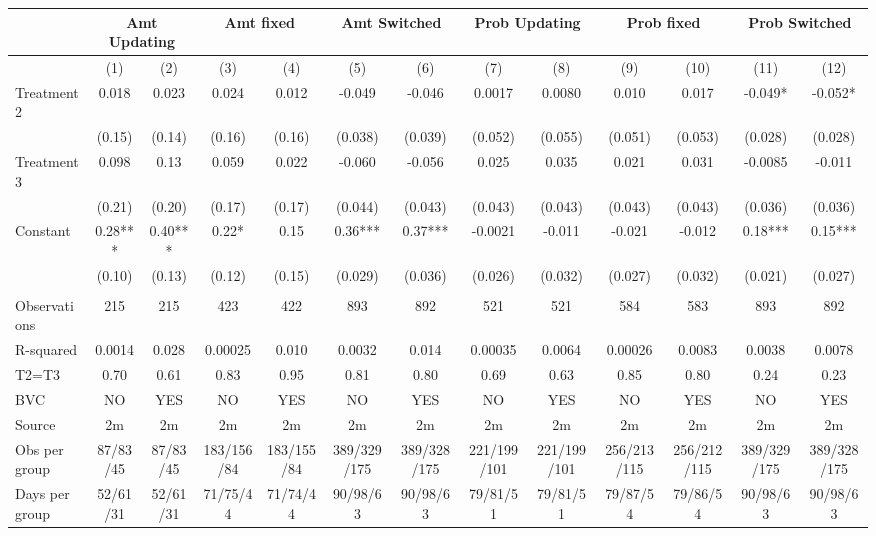 \begin{tabular}{lcccccccccccc}
\toprule
      & \multicolumn{2}{c}{Amt Updating } & \multicolumn{2}{c}{Amt fixed} & \multicolumn{2}{c}{Amt Switched } & \multicolumn{2}{c}{Prob Updating } & \multicolumn{2}{c}{Prob fixed} & \multicolumn{2}{c}{Prob Switched } \\
\midrule
\midrule
      & (1)   & (2)   & (3)   & (4)   & (5)   & (6)   & (7)   & (8)   & (9)   & (10)  & (11)  & (12) \\
\midrule
\midrule
Treatment 2 & 0.018 & 0.023 & 0.024 & 0.012 & -0.049 & -0.046 & 0.0017 & 0.0080 & 0.010 & 0.017 & -0.049* & -0.052* \\
      & (0.15) & (0.14) & (0.16) & (0.16) & (0.038) & (0.039) & (0.052) & (0.055) & (0.051) & (0.053) & (0.028) & (0.028) \\
Treatment 3 & 0.098 & 0.13  & 0.059 & 0.022 & -0.060 & -0.056 & 0.025 & 0.035 & 0.021 & 0.031 & -0.0085 & -0.011 \\
      & (0.21) & (0.20) & (0.17) & (0.17) & (0.044) & (0.043) & (0.043) & (0.043) & (0.043) & (0.043) & (0.036) & (0.036) \\
Constant & 0.28*** & 0.40*** & 0.22* & 0.15  & 0.36*** & 0.37*** & -0.0021 & -0.011 & -0.021 & -0.012 & 0.18*** & 0.15*** \\
      & (0.10) & (0.13) & (0.12) & (0.15) & (0.029) & (0.036) & (0.026) & (0.032) & (0.027) & (0.032) & (0.021) & (0.027) \\
      &       &       &       &       &       &       &       &       &       &       &       &  \\
\midrule
Observations & 215   & 215   & 423   & 422   & 893   & 892   & 521   & 521   & 584   & 583   & 893   & 892 \\
R-squared & 0.0014 & 0.028 & 0.00025 & 0.010 & 0.0032 & 0.014 & 0.00035 & 0.0064 & 0.00026 & 0.0083 & 0.0038 & 0.0078 \\
T2=T3 & 0.70  & 0.61  & 0.83  & 0.95  & 0.81  & 0.80  & 0.69  & 0.63  & 0.85  & 0.80  & 0.24  & 0.23 \\
BVC   & NO    & YES   & NO    & YES   & NO    & YES   & NO    & YES   & NO    & YES   & NO    & YES \\
Source & 2m    & 2m    & 2m    & 2m    & 2m    & 2m    & 2m    & 2m    & 2m    & 2m    & 2m    & 2m \\
Obs per group & 87/83/45 & 87/83/45 & 183/156/84 & 183/155/84 & 389/329/175 & 389/328/175 & 221/199/101 & 221/199/101 & 256/213/115 & 256/212/115 & 389/329/175 & 389/328/175 \\
Days per group & 52/61/31 & 52/61/31 & 71/75/44 & 71/74/44 & 90/98/63 & 90/98/63 & 79/81/51 & 79/81/51 & 79/87/54 & 79/86/54 & 90/98/63 & 90/98/63 \\
\bottomrule
\bottomrule
\end{tabular}%
